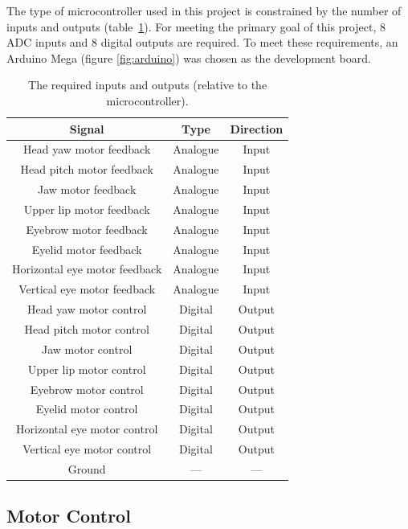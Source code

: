 \documentclass[11pt]{article} %
\begin{document}
The type of microcontroller used in this project is constrained by the number of inputs and outputs (table~\ref{tab:gpio}).
For meeting the primary goal of this project, 8 ADC inputs and 8 digital outputs are required.
To meet these requirements, an Arduino Mega (figure \ref{fig:arduino}) was chosen as the development board.


\begin{table}[h]
	\caption{The required inputs and outputs (relative to the microcontroller).}
	\centering
	\begin{tabular}{ |c|c|c| }
		\hline
		\textbf{Signal} & \textbf{Type} & \textbf{Direction} \\
		\hline
		Head yaw motor feedback & Analogue & Input \\
		Head pitch motor feedback & Analogue & Input \\
		Jaw motor feedback & Analogue & Input \\
		Upper lip motor feedback & Analogue & Input \\
		Eyebrow motor feedback & Analogue & Input \\
		Eyelid motor feedback & Analogue & Input \\
		Horizontal eye motor feedback & Analogue & Input \\
		Vertical eye motor feedback & Analogue & Input \\
		Head yaw motor control & Digital & Output \\
		Head pitch motor control & Digital & Output \\
		Jaw motor control & Digital & Output \\
		Upper lip motor control & Digital & Output \\
		Eyebrow motor control & Digital & Output \\
		Eyelid motor control & Digital & Output \\
		Horizontal eye motor control & Digital & Output \\
		Vertical eye motor control & Digital & Output \\
		Ground & --- & --- \\
		\hline
	\end{tabular}
	\label{tab:gpio}
\end{table}

\subsection{Motor Control}
\end{document}
